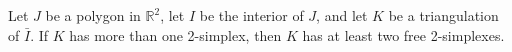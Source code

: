 Let $J$ be a polygon in $\mathbb{R}^2$, let $I$ be the interior of $J$, and let $K$ be a triangulation of $\bar{I}$. If $K$ has more than one 2-simplex, then $K$ has at least two free 2-simplexes.
